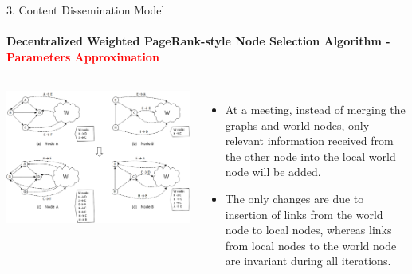 \documentclass{beamer}		%
\begin{document}
\begin{frame}{3. Content Dissemination Model}
\framesubtitle{Decentralized Weighted PageRank-style Node Selection Algorithm - \textcolor{red}{Parameters Approximation}}
\begin{columns}
\includegraphics[scale=0.048]{Fig3.png}
\begin{itemize}
    \item At a meeting, instead of merging the graphs and world nodes, only relevant information received from the other node into the local world node will be added. 
    \item The only changes are due to insertion of links from the world node to local nodes, whereas links from local nodes to the world node are invariant during all iterations.
\end{itemize}
\end{columns}
\end{frame}
\end{document}
